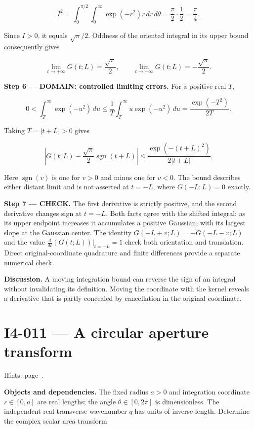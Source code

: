 \documentclass[11pt,oneside,openany]{book}
\begin{document}
\[
I^2=\int_0^{\pi/2}\int_0^\infty\exp(-r^2)r\,dr\,d\theta
=\frac\pi2\cdot\frac12=\frac\pi4.
\]

Since \(I>0\), it equals \(\sqrt\pi/2\). Oddness of the oriented integral in its upper bound consequently gives

\[
\lim_{t\to+\infty}G(t;L)=\frac{\sqrt\pi}{2},\qquad
\lim_{t\to-\infty}G(t;L)=-\frac{\sqrt\pi}{2}.
\]

\begin{DomainStep}
\textbf{Step 6 --- DOMAIN: controlled limiting errors.} For a positive real \(T\),

\[
0<\int_T^\infty\exp(-u^2)\,du
\le\frac1T\int_T^\infty u\exp(-u^2)\,du
=\frac{\exp(-T^2)}{2T}.
\]

Taking \(T=|t+L|>0\) gives

\[
\left|G(t;L)-\frac{\sqrt\pi}{2}\operatorname{sgn}(t+L)\right|
\le\frac{\exp(-(t+L)^2)}{2|t+L|}.
\]

Here \(\operatorname{sgn}(v)\) is one for \(v>0\) and minus one for \(v<0\). The bound describes either distant limit and is not asserted at \(t=-L\), where \(G(-L;L)=0\) exactly.

\end{DomainStep}
\textbf{Step 7 --- CHECK.} The first derivative is strictly positive, and the second derivative changes sign at \(t=-L\). Both facts agree with the shifted integral: as its upper endpoint increases it accumulates a positive Gaussian, with its largest slope at the Gaussian center. The identity \(G(-L+v;L)=-G(-L-v;L)\) and the value \(\frac{d}{dt}(G(t;L))|_{t=-L}=1\) check both orientation and translation. Direct original-coordinate quadrature and finite differences provide a separate numerical check.

\textbf{Discussion.} A moving integration bound can reverse the sign of an integral without invalidating its definition. Moving the coordinate with the kernel reveals a derivative that is partly concealed by cancellation in the original coordinate.
\clearpage
\section{I4-011 --- A circular aperture transform}
\label{problem:I4-011}
{\small Hints: page~\pageref{hints:I4-011}.}\par\medskip

\textbf{Objects and dependencies.} The fixed radius \(a>0\) and integration coordinate \(r\in[0,a]\) are real lengths; the angle \(\theta\in[0,2\pi]\) is dimensionless. The independent real transverse wavenumber \(q\) has units of inverse length. Determine the complex scalar area transform
\end{document}
